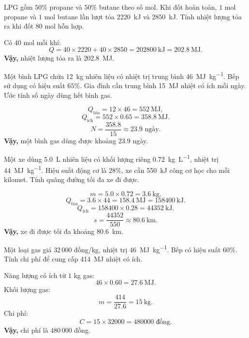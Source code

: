 \begin{tuluyen}
LPG gồm $50\%$ propane và $50\%$ butane theo số mol. Khi đốt hoàn toàn, $1$ mol propane và $1$ mol butane lần lượt tỏa \SI{2220}{\kilo\joule} và \SI{2850}{\kilo\joule}. Tính nhiệt lượng tỏa ra khi đốt $80$ mol hỗn hợp.
\begin{loigiaiBT}
Có $40$ mol mỗi khí:
\[
Q=40\times2220+40\times2850=\SI{202800}{\kilo\joule}=\SI{202.8}{\mega\joule}.
\]
\textbf{Vậy,} nhiệt lượng tỏa ra là \SI{202.8}{\mega\joule}.
\end{loigiaiBT}
\end{tuluyen}

\begin{tuluyen}
Một bình LPG chứa \SI{12}{\kilo\gram} nhiên liệu có nhiệt trị trung bình \SI{46}{\mega\joule\per\kilo\gram}. Bếp sử dụng có hiệu suất $65\%$. Gia đình cần trung bình \SI{15}{\mega\joule} nhiệt có ích mỗi ngày. Ước tính số ngày dùng hết bình gas.
\begin{loigiaiBT}
\[
Q_{\text{tỏa}}=12\times46=\SI{552}{\mega\joule},
\]
\[
Q_{\text{ích}}=552\times0.65=\SI{358.8}{\mega\joule}.
\]
\[
N=\frac{358.8}{15}\approx23.9\text{ ngày}.
\]
\textbf{Vậy,} một bình gas dùng được khoảng $23.9$ ngày.
\end{loigiaiBT}
\end{tuluyen}

\begin{tuluyen}
Một xe dùng \SI{5.0}{\liter} nhiên liệu có khối lượng riêng \SI{0.72}{\kilo\gram\per\liter}, nhiệt trị \SI{44}{\mega\joule\per\kilo\gram}. Hiệu suất động cơ là $28\%$, xe cần \SI{550}{\kilo\joule} công cơ học cho mỗi kilomet. Tính quãng đường tối đa xe đi được.
\begin{loigiaiBT}
\[
m=5.0\times0.72=\SI{3.6}{\kilo\gram}.
\]
\[
Q_{\text{tỏa}}=3.6\times44=\SI{158.4}{\mega\joule}=\SI{158400}{\kilo\joule}.
\]
\[
Q_{\text{ích}}=158400\times0.28=\SI{44352}{\kilo\joule}.
\]
\[
s=\frac{44352}{550}\approx\SI{80.6}{\kilo\metre}.
\]
\textbf{Vậy,} xe đi được tối đa khoảng \SI{80.6}{\kilo\metre}.
\end{loigiaiBT}
\end{tuluyen}

\begin{tuluyen}
Một loại gas giá $32\,000$ đồng/kg, nhiệt trị \SI{46}{\mega\joule\per\kilo\gram}. Bếp có hiệu suất $60\%$. Tính chi phí để cung cấp \SI{414}{\mega\joule} nhiệt có ích.
\begin{loigiaiBT}
Năng lượng có ích từ $1$ kg gas:
\[
46\times0.60=\SI{27.6}{\mega\joule}.
\]
Khối lượng gas:
\[
m=\frac{414}{27.6}=\SI{15}{\kilo\gram}.
\]
Chi phí:
\[
C=15\times32000=480000\text{ đồng}.
\]
\textbf{Vậy,} chi phí là $480\,000$ đồng.
\end{loigiaiBT}
\end{tuluyen}

